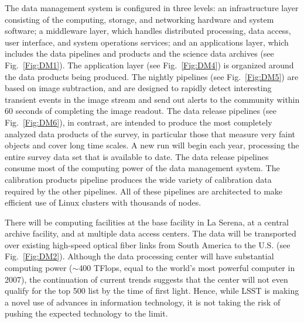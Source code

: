 \documentclass{emulateapj}
\begin{document}
The data management system is configured in three levels: an
infrastructure layer consisting of the computing, storage, and
networking hardware and system software; a middleware layer, which
handles distributed processing, data access, user interface, and
system operations services; and an applications layer, which includes
the data pipelines and products and the science data archives (see
Fig.~\ref{Fig:DM1}). The application layer (see Fig.~\ref{Fig:DM4})
is organized around the data products being produced.  The nightly
pipelines (see Fig.~\ref{Fig:DM5}) are based on image subtraction,
and are designed to rapidly detect interesting transient events in the
image stream and send out alerts to the community within 60 seconds of
completing the image readout.  The data release
pipelines (see Fig.~\ref{Fig:DM6}), in contrast, are intended to
produce the most completely analyzed data products of the survey, in
particular those that measure very faint objects and cover long time
scales. A new run will begin each year, processing the entire survey data
set that is available to date. The data release pipelines consume most of the
computing power of the data management system.  The calibration
products pipeline produces the wide variety of calibration data
required by the other pipelines.  All of these pipelines are
architected to make efficient use of Linux clusters with thousands of
nodes.

There will be computing facilities at the base facility in La Serena,
at a central archive facility, and at multiple data access 
centers. The data will be transported over existing high-speed optical fiber 
links from South America to the U.S. (see Fig.~\ref{Fig:DM2}).
Although the data processing center will have substantial computing power ($\sim$400 
TFlops, equal to the world's most powerful computer in 2007), the continuation of 
current trends suggests that the center will 
not even qualify for the top 500 list by the time of first light.
Hence, while LSST is making a novel use of advances in information technology, 
it is not taking the risk of pushing the expected technology to the limit.  
\end{document}
